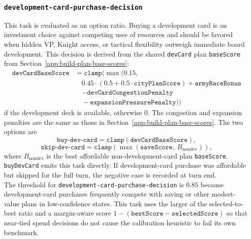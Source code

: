 \documentclass{article}
\begin{document}
\subsubsection{\texttt{development-card-purchase-decision}}
\label{app:task-development-card-purchase-decision}
This task is evaluated as an option ratio.
Buying a development card is an investment choice against competing uses of resources and should be favored when hidden VP, Knight access, or tactical flexibility outweigh immediate board development.
This decision is derived from the shared \texttt{devCard} plan \texttt{baseScore} from Section~\ref{app:build-plan-base-scores}:
\[
\begin{aligned}
\texttt{devCardBaseScore}
&= \texttt{clamp}\bigl(\max(0.15, \\
&\quad 0.45 \cdot (0.5 + 0.5 \cdot \texttt{cityPlanScore})
+ \texttt{armyRaceBonus} \\
&\quad - \texttt{devCardCongestionPenalty} \\
&\quad - \texttt{expansionPressurePenalty})\bigr)
\end{aligned}
\]
if the development deck is available, otherwise $0$. The congestion and expansion penalties are the same as those in Section~\ref{app:build-plan-base-scores}. The two options are
\[
\texttt{buy-dev-card} = \texttt{clamp}(\texttt{devCardBaseScore}),
\]
\[
\texttt{skip-dev-card}
= \texttt{clamp}(\max(\texttt{saveScore},\ B_{\text{nondev}})),
\]
where $B_{\text{nondev}}$ is the best affordable non-development-card plan \texttt{baseScore}.
\texttt{buyDevCard} emits this task directly. If development-card purchase was affordable but skipped for the full turn, the negative case is recorded at turn end.
\\
The threshold for \texttt{development-card-purchase-decision} is $0.85$ because development-card purchases frequently compete with saving or other modest-value plans in low-confidence states. This task uses the larger of the selected-to-best ratio and a margin-aware score $1-(\texttt{bestScore}-\texttt{selectedScore})$ so that near-tied spend decisions do not cause the calibration heuristic to fail its own benchmark.
\end{document}
